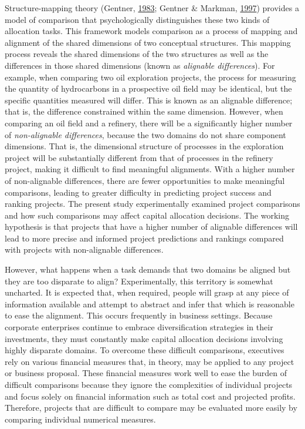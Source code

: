 \documentclass[
  english,
  man, donotrepeattitle,floatsintext]{apa7}
\theoremstyle{definition}
\theoremstyle{definition}
\theoremstyle{definition}
\theoremstyle{definition}
\theoremstyle{remark}
\begin{document}
Structure-mapping theory (Gentner, \protect\hyperlink{ref-gentner1983}{1983}; Gentner \& Markman, \protect\hyperlink{ref-gentner1997}{1997}) provides a model of
comparison that psychologically distinguishes these two kinds of allocation
tasks. This framework models comparison as a process of mapping and alignment of
the shared dimensions of two conceptual structures. This mapping process reveals
the shared dimensions of the two structures as well as the differences in those
shared dimensions (known as \emph{alignable differences}). For example, when
comparing two oil exploration projects, the process for measuring the quantity
of hydrocarbons in a prospective oil field may be identical, but the specific
quantities measured will differ. This is known as an alignable difference; that
is, the difference constrained within the same dimension. However, when
comparing an oil field and a refinery, there will be a significantly higher
number of \emph{non-alignable differences}, because the two domains do not share
component dimensions. That is, the dimensional structure of processes in the
exploration project will be substantially different from that of processes in
the refinery project, making it difficult to find meaningful alignments. With a
higher number of non-alignable differences, there are fewer opportunities to
make meaningful comparisons, leading to greater difficulty in predicting project
success and ranking projects. The present study experimentally examined project
comparisons and how such comparisons may affect capital allocation decisions.
The working hypothesis is that projects that have a higher number of alignable
differences will lead to more precise and informed project predictions and
rankings compared with projects with non-alignable differences.

However, what happens when a task demands that two domains be aligned but they
are too disparate to align? Experimentally, this territory is somewhat
uncharted. It is expected that, when required, people will grasp at any piece of
information available and attempt to abstract and infer that which is reasonable
to ease the alignment. This occurs frequently in business settings. Because
corporate enterprises continue to embrace diversification strategies in their
investments, they must constantly make capital allocation decisions involving
highly disparate domains. To overcome these difficult comparisons, executives
rely on various financial measures that, in theory, may be applied to any
project or business proposal. These financial measures work well to ease the
burden of difficult comparisons because they ignore the complexities of
individual projects and focus solely on financial information such as total cost
and projected profits. Therefore, projects that are difficult to compare may be
evaluated more easily by comparing individual numerical measures.
\end{document}
